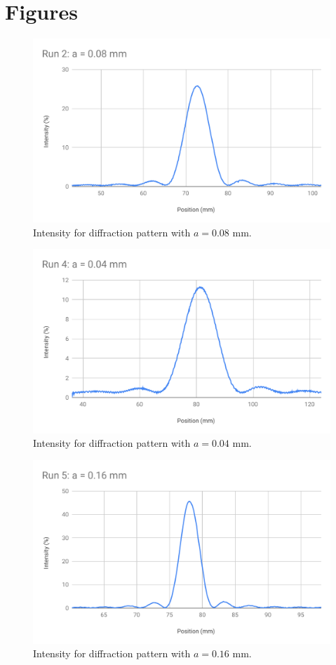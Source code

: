 \section{Figures}
%
\begin{figure}[ht!]
	\centering
	\includegraphics[scale=0.74]{image/11-diffraction/chart1.pdf}
	\caption{Intensity for diffraction pattern with $a = 0.08$ mm.}
	\label{figure.11.chart1}
\end{figure}
%
\begin{figure}[ht!]
	\centering
	\includegraphics[scale=0.74]{image/11-diffraction/chart2.pdf}
	\caption{Intensity for diffraction pattern with $a = 0.04$ mm.}
	\label{figure.11.chart2}
\end{figure}
%
\begin{figure}[ht!]
	\centering
	\includegraphics[scale=0.74]{image/11-diffraction/chart3.pdf}
	\caption{Intensity for diffraction pattern with $a = 0.16$ mm.}
	\label{figure.11.chart3}
\end{figure}
%